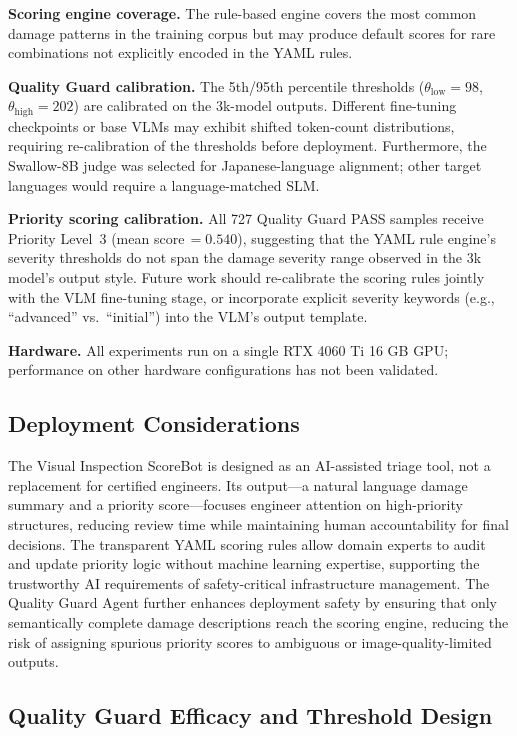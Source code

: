 \documentclass[twocolumn]{article}
\begin{document}
\textbf{Scoring engine coverage.}
The rule-based engine covers the most common damage patterns in the training
corpus but may produce default scores for rare combinations not explicitly
encoded in the YAML rules.

\textbf{Quality Guard calibration.}
The 5th/95th percentile thresholds ($\theta_{\text{low}}=98$,
$\theta_{\text{high}}=202$) are calibrated on the 3k-model outputs.
Different fine-tuning checkpoints or base VLMs may exhibit shifted
token-count distributions, requiring re-calibration of the thresholds
before deployment.
Furthermore, the Swallow-8B judge was selected for Japanese-language
alignment; other target languages would require a language-matched SLM.

\textbf{Priority scoring calibration.}
All 727 Quality Guard PASS samples receive Priority Level~3
(mean score\,$= 0.540$), suggesting that the YAML rule engine's
severity thresholds do not span the damage severity range observed
in the 3k model's output style.
Future work should re-calibrate the scoring rules jointly with the
VLM fine-tuning stage, or incorporate explicit severity keywords
(e.g., ``advanced'' vs.\ ``initial'') into the VLM's output template.

\textbf{Hardware.}
All experiments run on a single RTX 4060 Ti 16 GB GPU;
performance on other hardware configurations has not been validated.

\subsection{Deployment Considerations}

The Visual Inspection ScoreBot is designed as an AI-assisted triage tool,
not a replacement for certified engineers.
Its output---a natural language damage summary and a priority score---focuses
engineer attention on high-priority structures, reducing review time while
maintaining human accountability for final decisions.
The transparent YAML scoring rules allow domain experts to audit and update
priority logic without machine learning expertise, supporting the trustworthy
AI requirements of safety-critical infrastructure management.
The Quality Guard Agent further enhances deployment safety by ensuring that
only semantically complete damage descriptions reach the scoring engine,
reducing the risk of assigning spurious priority scores to ambiguous or
image-quality-limited outputs.

\subsection{Quality Guard Efficacy and Threshold Design}
\label{sec:disc_qg}
\end{document}
